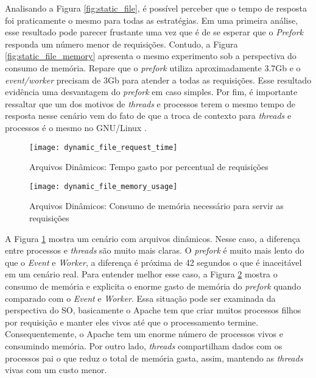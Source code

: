 Analisando a Figura \ref{fig:static_file}, é possível perceber que o tempo de
resposta foi praticamente o mesmo para todas as estratégias. Em uma primeira
análise, esse resultado pode parecer frustante uma vez que é de se esperar que
o \emph{Prefork} responda um número menor de requisições. Contudo, a Figura
\ref{fig:static_file_memory} apresenta o mesmo experimento sob a perspectiva do
consumo de memória. Repare que o \emph{prefork} utiliza aproximadamente 3.7Gb e
o \emph{event/worker} precisam de 3Gb para atender a todas as requisições. Esse
resultado evidência uma desvantagem do \emph{prefork} em caso simples. Por fim,
é importante ressaltar que um dos motivos de \emph{threads} e processos terem o
mesmo tempo de resposta nesse cenário vem do fato de que a troca de contexto
para \emph{threads} e processos é o mesmo no GNU/Linux
\citep{linux_kernel_development}.

\begin{figure}[!h]
  \centering
  \texttt{[image: dynamic\_file\_request\_time]}

  \caption{Arquivos Dinâmicos: Tempo gasto por percentual de requisições}
  \label{fig:dynamic_file}
\end{figure}

\begin{figure}[!h]
  \centering
  \texttt{[image: dynamic\_file\_memory\_usage]}

  \caption{Arquivos Dinâmicos: Consumo de memória necessário para servir as requisições}
  \label{fig:dynamic_file_memory}
\end{figure}

A Figura \ref{fig:dynamic_file} mostra um cenário com arquivos dinâmicos. Nesse
caso, a diferença entre processos e \emph{threads} são muito mais claras. O
\emph{prefork} é muito mais lento do que o \emph{Event} e \emph{Worker}, a
diferença é próxima de 42 segundos o que é inaceitável em um cenário real.
Para entender melhor esse caso, a Figura \ref{fig:dynamic_file_memory} mostra o
consumo de memória e explicita o enorme gasto de memória do \emph{prefork}
quando comparado com o \emph{Event} e \emph{Worker}. Essa situação pode ser
examinada da perspectiva do SO, basicamente o Apache tem que criar muitos
processos filhos por requisição e manter eles vivos até que o processamento
termine. Consequentemente, o Apache tem um enorme número de processos vivos e
consumindo memória. Por outro lado, \emph{threads} compartilham dados com os
processos pai o que reduz o total de memória gasta, assim, mantendo as
\emph{threads} vivas com um custo menor.

